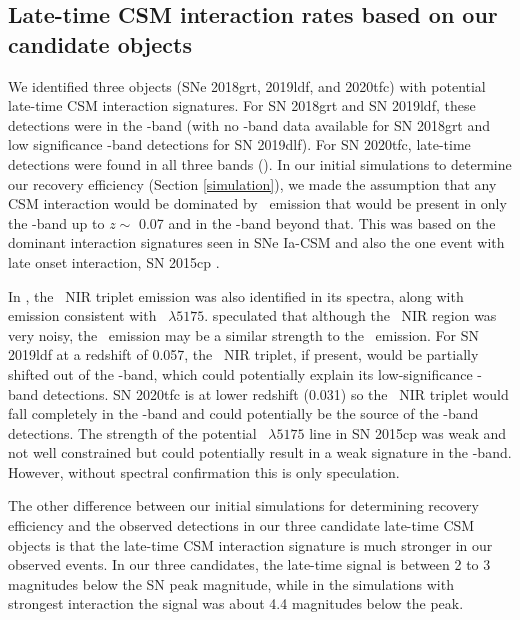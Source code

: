 \documentclass[a4paper,oneside,12pt, class=Latex/Classes/PhDthesisPSnPDF, crop=false]{standalone}
\begin{document}
\subsection{Late-time CSM interaction rates based on our candidate objects}
\label{rates_csm}

 We identified three objects (SNe 2018grt, 2019ldf, and 2020tfc) with potential late-time CSM interaction signatures. For SN 2018grt and SN 2019ldf, these detections were in the \ztfr-band (with no \ztfi-band data available for SN 2018grt and low significance \ztfi-band detections for SN 2019dlf). For SN 2020tfc, late-time detections were found in all three bands (\ztfg\ztfr\ztfi). In our initial simulations to determine our recovery efficiency (Section \ref{simulation}), we made the assumption that any CSM interaction would be dominated by \Halpha~emission that would be present in only the \ztfr-band up to $z \sim$ 0.07 and in the \ztfi-band beyond that. This was based on the dominant interaction signatures seen in SNe Ia-CSM and also the one event with late onset interaction, SN 2015cp \citep{2015cp}. 

In \citet{2015cp}, the \CaII\ NIR triplet emission was also identified in its spectra, along with emission consistent with \MgI~$\lambda5175$. \cite{2018ApJ...868...21H} speculated that although the \CaII\ NIR region was very noisy, the \CaII\ emission may be a similar strength to the \Halpha~emission. For SN 2019ldf at a redshift of 0.057, the \CaII\ NIR triplet, if present, would be partially shifted out of the \ztfi-band, which could potentially explain its low-significance \ztfi-band detections. SN 2020tfc is at lower redshift (0.031) so the \CaII\ NIR triplet would fall completely in the \ztfi-band and could potentially be the source of the \ztfi-band detections. The strength of the potential \MgI~$\lambda5175$ line in SN 2015cp was weak and not well constrained \citep{2015cp} but could potentially result in a weak signature in the \ztfg-band. However, without spectral confirmation this is only speculation.

The other difference between our initial simulations for determining recovery efficiency and the observed detections in our three candidate late-time CSM objects is that the late-time CSM interaction signature is much stronger in our observed events. In our three candidates, the late-time signal is between 2 to 3 magnitudes below the SN peak magnitude, while in the simulations with strongest interaction the signal was about 4.4 magnitudes below the peak.
\end{document}
